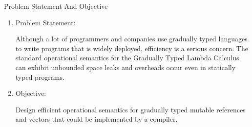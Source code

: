 \documentclass[12pt,dvipsnames]{beamer}
\begin{document}
\begin{frame}{Problem Statement And Objective}
  \begin{enumerate}
  \item Problem Statement:
  \begin{center}
    Although a lot of programmers and companies use gradually typed
    languages to write programs that is widely deployed, efficiency is a
    serious concern. The standard operational semantics for the
    Gradually Typed Lambda Calculus can exhibit unbounded space leaks
    and overheads occur even in statically typed programs.
  \end{center}
\item Objective:
  \begin{center}
    Design efficient operational semantics for gradually typed mutable
    references and vectors that could be implemented by a compiler.
  \end{center}
  \end{enumerate}
\end{frame}


\end{document}
